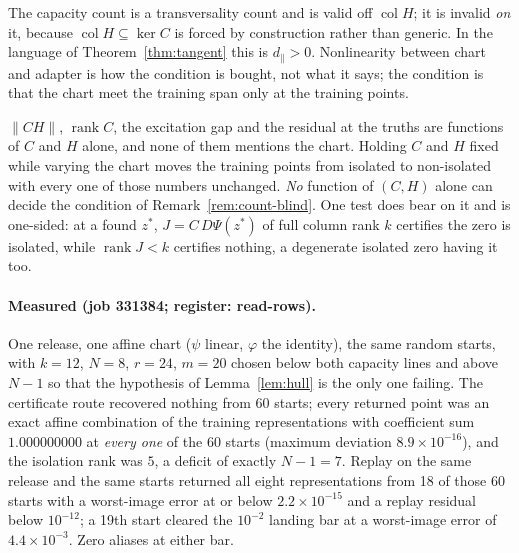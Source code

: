 \begin{remark}\label{rem:count-blind}
The capacity count is a transversality count and is valid off $\operatorname{col}H$; it is invalid
\emph{on} it, because $\operatorname{col}H\subseteq\ker C$ is forced by construction rather than
generic. In the language of Theorem~\ref{thm:tangent} this is $d_\parallel>0$. Nonlinearity between
chart and adapter is how the condition is bought, not what it says; the condition is that the chart
meet the training span only at the training points.
\end{remark}

\begin{remark}\label{rem:checks}
$\|CH\|$, $\operatorname{rank}C$, the excitation gap and the residual at the truths are functions of
$C$ and $H$ alone, and none of them mentions the chart. Holding $C$ and $H$ fixed while varying the
chart moves the training points from isolated to non-isolated with every one of those numbers
unchanged. \emph{No} function of $(C,H)$ alone can decide the condition of
Remark~\ref{rem:count-blind}. One test does bear on it and is one-sided: at a found $z^{\ast}$,
$J=C\,D\Psi(z^{\ast})$ of full column rank $k$ certifies the zero is isolated, while
$\operatorname{rank}J<k$ certifies nothing, a degenerate isolated zero having it too.
\end{remark}

\paragraph{Measured (job 331384; register: read-rows).} One release, one affine chart
($\psi$ linear, $\varphi$ the identity), the same random starts, with $k=12$, $N=8$, $r=24$, $m=20$
chosen below both capacity lines and above $N-1$ so that the hypothesis of Lemma~\ref{lem:hull} is
the only one failing. The certificate route recovered nothing from 60 starts; every returned point
was an exact affine combination of the training representations with coefficient sum
$1.000000000$ at \emph{every one} of the 60 starts (maximum deviation $8.9\times10^{-16}$), and the
isolation rank was $5$,
a deficit of exactly $N-1=7$. Replay on the same release and the same starts returned all eight
representations from 18 of those 60 starts with a worst-image error at or below
$2.2\times10^{-15}$ and a replay residual below $10^{-12}$; a 19th start cleared the $10^{-2}$ landing
bar at a worst-image error of $4.4\times10^{-3}$. Zero aliases at either bar.

